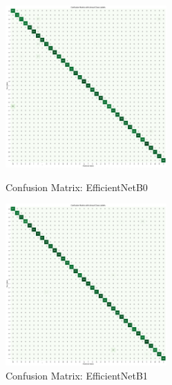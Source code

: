 \begin{figure}[h!]
    \centering
    \includegraphics[width=0.55\textwidth]{Assets/confusion_matrix/EfficientNetB0.png}
    \caption{Confusion Matrix: EfficientNetB0}
    \vspace{1.5cm}
    \includegraphics[width=0.55\textwidth]{Assets/confusion_matrix/efficientnetv2.png}
    \caption{Confusion Matrix: EfficientNetB1}
\end{figure}

\newpage

